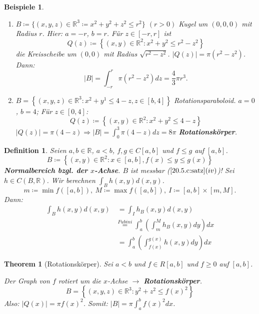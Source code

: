 \documentclass[12pt]{extreport} %
\newcommand{\R}{\mathbb{R}}
\theoremstyle{named}
\theoremstyle{nnamed}
\newtheorem*{unnamedtheorem*}{Theorem}
\theoremstyle{itshape}
\newtheorem*{definition}{Definition}
\theoremstyle{normal}
\newtheorem*{beispiele}{Beispiele}
\begin{document}
\begin{beispiele} ~\ 
	\begin{enumerate}
		\item $B \coloneqq \{ (x, y, z) \in \R^{3} \coloneqq x^{2} + y^{2} + z^{2} \leq r^{2} \}$ $(r > 0)$ Kugel um $(0, 0, 0)$ mit Radius $r$. Hier: $a = -r$, $b = r$. Für $z \in [-r, r]$ ist
			$$ Q(z) \coloneqq \left\{ (x, y) \in \R^{2} \colon x^{2} + y^{2} \leq r^{2} - z^{2} \right\} $$
			die Kreisscheibe um $(0, 0)$ mit Radius $\sqrt{r^{2} - z^{2}}$. $|Q(z)| = \pi \left( r^{2} - z^{2} \right)$. Dann:
			$$ |B| = \int_{-r}^{r} \pi \left( r^{2} - z^{2} \right) dz = \frac{4}{3} \pi r^{3}. $$ %
		\item $B = \left\{ (x, y, z) \in \R^{3} \colon x^{2} + y^{1} \leq 4 - z, z \in [b, 4] \right\}$ Rotationsparaboloid. $a = 0$, $b = 4$; Für $z \in [0, 4]$:
			$$ Q(z) \coloneqq \left\{ (x, y) \in \R^{2} \colon x^{2} + y^{2} \leq 4 - z \right\} $$
			$|Q(z)| = \pi \left( 4 - z\right) \Rightarrow |B| = \int_{0}^{3} \pi (4 - z) dz = 8 \pi$  \textbf{Rotationskörper}. %
	\end{enumerate}	
\end{beispiele}

\begin{definition}
	Seien $a, b \in \R$, $a < b$, $f,g \in C[a, b]$ und $f \leq g$ auf $[a, b]$.
	$$ B \coloneqq \left\{ (x, y) \in \R^{2} \colon x \in [a, b], f(x) \leq y \leq g(x) \right\} $$
	\textbf{Normalbereich bzgl. der $x$-Achse}. $B$ ist messbar ($\ref{20.5.c:satz}  (iv)$)! Sei $h \in C(B, \R)$. Wir berechnen $\int_{B} h(x, y) d(x, y)$.
	$$ m \coloneqq \min f\left( [a, b] \right), ~ M \coloneqq \max f \left( [a, b] \right), ~ I \coloneqq [a, b] \times [m, M]. $$
	Dann:
	\begin{align*}
		\int_{B} h(x, y) d(x, y) & ~ = \int_{I} h_{B}(x, y) d(x, y) \\
		& \overset{Fubini}{=} \int_{a}^{b} \left( \int_{m}^{M} h_{B}(x, y) dy \right) dx \\
		& ~ = \int_{a}^{b} \left( \int_{f(x)}^{g(x)} h(x, y) dy \right) dx
	\end{align*} %
\end{definition}

\begin{unnamedtheorem*}[Rotationskörper]
	Sei $a < b$ und $f \in R[a, b]$ und $f \geq 0$ auf $[a, b]$. %
	
	\bigskip
	
	Der Graph von $f$ rotiert um die $x$-Achse $\rightarrow$ \textbf{Rotationskörper}.
	$$ B = \left\{ (x,y,z) \in \R^{3}: y^{2} + z^{2} \leq f(x)^{2} \right\} $$
	Also: $|Q(x)| = \pi f(x)^{2}$. Somit: $|B| = \pi \int_{a}^{b} f(x)^{2} dx$.
\end{unnamedtheorem*}
\end{document}
